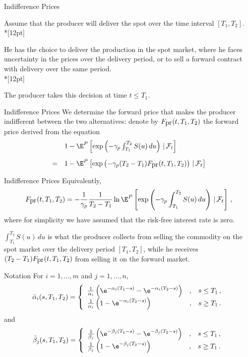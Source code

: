 {Indifference Prices}

Assume that the producer will deliver the spot over the time
interval $[T_1,T_2]$.\\*[12pt]

He has the choice to deliver the production in
the spot market, where he faces uncertainty in the prices over the
delivery period, or to sell a forward contract with delivery over
the same period.\\*[12pt]

The producer takes this decision at time $t\leq
T_1$.


{Indifference Prices}
We determine the forward price that makes the producer indifferent
between the two alternatives: denote by $F_{\hbox{pr}}(t,T_1,T_2)$
the forward price derived from the equation
$$
\begin{array}{ll}


& 1-\E^P\left[\exp\left(-\gamma_p\int_{T_1}^{T_2}S(u)\,du\right)\,|\,
\mathcal{F}_t\right]\\*[12pt]
= & 1-\E^P\left[\exp\left(-\gamma_p(T_2-T_1)F_{\hbox{pr}}(t,T_1,T_2)\right)\,|\,
\mathcal{F}_t\right]
\end{array}
$$

{Indifference Prices}
Equivalently,
\begin{equation}
\label{def-producer}
F_{\hbox{pr}}(t,T_1,T_2)=-\frac1{\gamma_p}\frac1{T_2-T_1}\ln\E^P
\left[\exp\left(-\gamma_p\int_{T_1}^{T_2}S(u)\,du\right)\,|\,
\mathcal{F}_t\right]\,,
\end{equation}
where for simplicity we have assumed that the risk-free interest
rate is zero.

$\int_{T_1}^{T_2}S(u)\,du$ is what the
producer collects from selling the commodity on the spot market
over the delivery period $[T_1,T_2]$, while he receives
$(T_2-T_1)F_{\hbox{pr}}(t,T_1,T_2)$ from selling it on the forward
market.

{Notation}
For $i=1,\ldots,m$ and $j=1,\ldots,n$,
\begin{equation}\label{alpha bar}
\bar{\alpha}_i(s,T_1,T_2)=\left\{\begin{array}{lll}
\frac1{\alpha_i}\left(\e^{-\alpha_i(T_1-s)}-\e^{-\alpha_i(T_2-s)}\right) &
, &
s\leq T_1\,, \\
\frac1{\alpha_i}\left(1-\e^{-\alpha_i(T_2-s)}\right) & , & s\geq T_1\,.
\end{array}\right.
\end{equation}
and
\begin{equation}\label{beta bar}
\bar{\beta}_j(s,T_1,T_2)=\left\{\begin{array}{lll}
\frac1{\beta_j}\left(\e^{-\beta_j(T_1-s)}-\e^{-\beta_j(T_2-s)}\right) & ,
&
s\leq T_1\,, \\
\frac1{\beta_j}\left(1-\e^{-\beta_j(T_2-s)}\right) & , & s\geq T_1\,.
\end{array}\right.
\end{equation}



